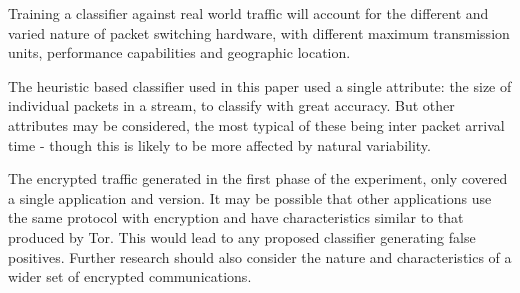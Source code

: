 \documentclass[conference]{IEEEtran}
\begin{document}
Training a classifier against real world traffic will account for the different
and varied nature of packet switching hardware, with different maximum
transmission units, performance capabilities and geographic location.

The heuristic based classifier used in this paper used a single attribute: the
size of individual packets in a stream, to classify with great accuracy. But
other attributes may be considered, the most typical of these being inter
packet arrival time - though this is likely to be more affected by natural
variability.

The encrypted traffic generated in the first phase of the experiment, only
covered a single application and version. It may be possible that other
applications use the same protocol with encryption and have characteristics
similar to that produced by Tor. This would lead to any proposed classifier
generating false positives. Further research should also consider the nature
and characteristics of a wider set of encrypted communications.

\printbibliography
\end{document}
